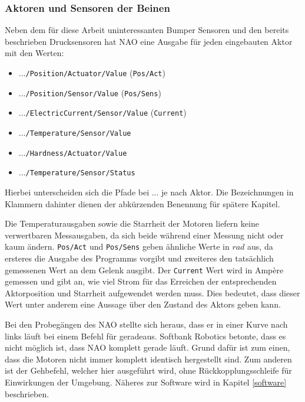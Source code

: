 \subsubsection*{Aktoren und Sensoren der Beinen}
Neben dem für diese Arbeit uninteressanten Bumper Sensoren und den bereits beschrieben Drucksensoren hat NAO eine Ausgabe für jeden eingebauten Aktor mit den Werten:
\begin{itemize}
	\item ...\texttt{/Position/Actuator/Value} (\texttt{Pos/Act})
	\item ...\texttt{/Position/Sensor/Value} (\texttt{Pos/Sens})
	\item ...\texttt{/ElectricCurrent/Sensor/Value} (\texttt{Current})
	\item ...\texttt{/Temperature/Sensor/Value}
	\item ...\texttt{/Hardness/Actuator/Value} 
	\item ...\texttt{/Temperature/Sensor/Status} 
\end{itemize}
Hierbei unterscheiden sich die Pfade bei \glqq ...\grqq{} je nach Aktor. Die Bezeichnungen in Klammern dahinter dienen der abkürzenden Benennung für spätere Kapitel. 

Die Temperaturausgaben sowie die Starrheit der Motoren liefern keine verwertbaren Messausgaben, da sich beide während einer Messung nicht oder kaum ändern. \texttt{Pos/Act} und \texttt{Pos/Sens} geben ähnliche Werte in $\unit{rad}$ aus, da ersteres die Ausgabe des Programms vorgibt und zweiteres den tatsächlich gemessenen Wert an dem Gelenk ausgibt. Der \texttt{Current} Wert wird in Ampère gemessen und gibt an, wie viel Strom für das Erreichen der entsprechenden Aktorposition und Starrheit aufgewendet werden muss. Dies bedeutet, dass dieser Wert unter anderem eine Aussage über den Zustand des Aktors geben kann. 

Bei den Probegängen des NAO stellte sich heraus, dass er in einer Kurve nach links läuft bei einem Befehl für geradeaus. Softbank Robotics betonte, dass es nicht möglich ist, dass NAO komplett gerade läuft. Grund dafür ist zum einen, dass die Motoren nicht immer komplett identisch hergestellt sind. Zum anderen ist der Gehbefehl, welcher hier ausgeführt wird, ohne Rückkopplungsschleife für Einwirkungen der Umgebung. Näheres zur Software wird in Kapitel \ref{software} beschrieben.





